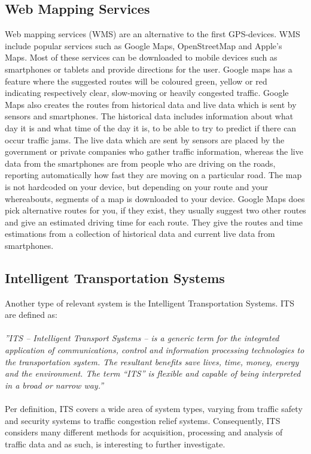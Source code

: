 \subsection*{Web Mapping Services}
Web mapping services (WMS) are an alternative to the first GPS-devices. WMS include popular services such as Google Maps, OpenStreetMap and Apple's Maps. Most of these services can be downloaded to mobile devices such as smartphones or tablets and provide directions for the user. Google maps has a feature where the suggested routes will be coloured green, yellow or red indicating respectively clear, slow-moving or heavily congested traffic.
Google Maps also creates the routes from historical data and live data which is sent by sensors and smartphones\cite{Googleabout}. The historical data includes information about what day it is and what time of the day it is, to be able to try to predict if there can occur traffic jams. The live data which are sent by sensors are placed by the government or private companies who gather traffic information, whereas the live data from the smartphones are from people who are driving on the roads, reporting automatically how fast they are moving on a particular road. The map is not hardcoded on your device, but depending on your route and your whereabouts, segments of a map is downloaded to your device. Google Maps does pick alternative routes for you, if they exist, they usually suggest two other routes and give an estimated driving time for each route. They give the routes and time estimations from a collection of historical data and current live data from smartphones\cite{Ncta}. 

\subsection*{Intelligent Transportation Systems}\label{sec:ITS}
Another type of relevant system is the Intelligent Transportation Systems. ITS are defined as:
\\\\
\emph{''ITS – Intelligent Transport Systems – is a generic term for the integrated application of
communications, control and information processing technologies to the transportation system. The
resultant benefits save lives, time, money, energy and the environment. The term “ITS” is flexible and
capable of being interpreted in a broad or narrow way.''}\cite{PIARC0}
\\\\
Per definition, ITS covers a wide area of system types, varying from traffic safety and security systems to traffic congestion relief systems. Consequently, ITS considers many different methods for acquisition, processing and analysis of traffic data and as such, is interesting to further investigate.

